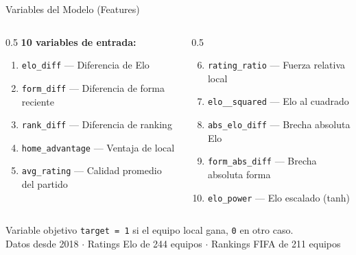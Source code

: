 \documentclass[aspectratio=169,11pt]{beamer}
\begin{document}
\begin{frame}{Variables del Modelo (Features)}
\begin{columns}[T]
\begin{column}{0.5\textwidth}
\textbf{\color{acento} 10 variables de entrada:}
\vspace{4pt}
\begin{enumerate}
  \item \texttt{elo\_diff} --- Diferencia de Elo
  \item \texttt{form\_diff} --- Diferencia de forma reciente
  \item \texttt{rank\_diff} --- Diferencia de ranking
  \item \texttt{home\_advantage} --- Ventaja de local
  \item \texttt{avg\_rating} --- Calidad promedio del partido
\end{enumerate}
\end{column}

\begin{column}{0.5\textwidth}
\vspace{22pt}
\begin{enumerate}
  \setcounter{enumi}{5}
  \item \texttt{rating\_ratio} --- Fuerza relativa local
  \item \texttt{elo\__squared} --- Elo al cuadrado
  \item \texttt{abs\_elo\_diff} --- Brecha absoluta Elo
  \item \texttt{form\_abs\_diff} --- Brecha absoluta forma
  \item \texttt{elo\_power} --- Elo escalado (tanh)
\end{enumerate}
\end{column}
\end{columns}

\vspace{10pt}
\begin{block}{Variable objetivo}
\texttt{target = 1} si el equipo local gana, \texttt{0} en otro caso.\\
\small{\color{acento!70!white} Datos desde 2018 $\cdot$ Ratings Elo de 244 equipos $\cdot$ Rankings FIFA de 211 equipos}
\end{block}
\end{frame}
\end{document}
